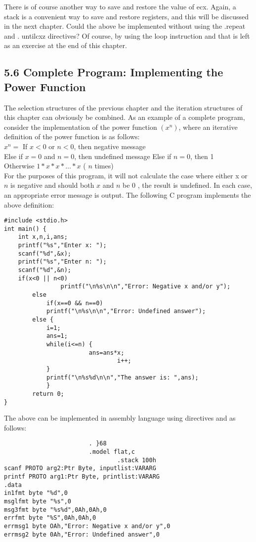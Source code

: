 \documentclass[10pt]{article}
\begin{document}
There is of course another way to save and restore the value of ecx. Again, a stack is a convenient way to save and restore registers, and this will be discussed in the next chapter. Could the above be implemented without using the .repeat and . untilcxz directives? Of course, by using the loop instruction and that is left as an exercise at the end of this chapter.

\subsection*{5.6 Complete Program: Implementing the Power Function}
The selection structures of the previous chapter and the iteration structures of this chapter can obviously be combined. As an example of a complete program, consider the implementation of the power function $\left(x^{n}\right)$, where an iterative definition of the power function is as follows:\\
$x^{n}=$ If $x<0$ or $n<0$, then negative message\\
Else if $x=0$ and $n=0$, then undefined message Else if $n=0$, then 1\\
Otherwise $1 * x * x * \ldots * x$ ( $n$ times)\\
For the purposes of this program, it will not calculate the case where either x or $n$ is negative and should both $x$ and $n$ be 0 , the result is undefined. In each case, an appropriate error message is output. The following C program implements the above definition:

\begin{verbatim}
#include <stdio.h>
int main() {
    int x,n,i,ans;
    printf("%s","Enter x: ");
    scanf("%d",&x);
    printf("%s","Enter n: ");
    scanf("%d",&n);
    if(x<0 || n<0)
                printf("\n%s\n\n","Error: Negative x and/or y");
        else
            if(x==0 && n==0)
            printf("\n%s\n\n","Error: Undefined answer");
        else {
            i=1;
            ans=1;
            while(i<=n) {
                        ans=ans*x;
                                i++;
            }
            printf("\n%s%d\n\n","The answer is: ",ans);
            }
        return 0;
}
\end{verbatim}

The above can be implemented in assembly language using directives and as follows:

\begin{verbatim}
                        . }68
                        .model flat,c
                                .stack 100h
scanf PROTO arg2:Ptr Byte, inputlist:VARARG
printf PROTO arg1:Ptr Byte, printlist:VARARG
.data
in1fmt byte "%d",0
msglfmt byte "%s",0
msg3fmt byte "%s%d",0Ah,0Ah,0
errfmt byte "%S",0Ah,0Ah,0
errmsg1 byte OAh,"Error: Negative x and/or y",0
errmsg2 byte 0Ah,"Error: Undefined answer",0
\end{verbatim}
\end{document}
